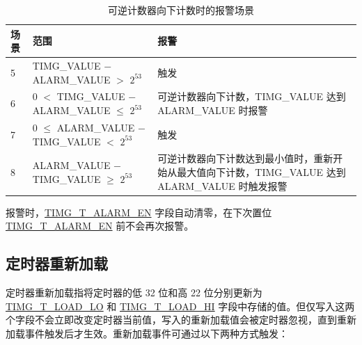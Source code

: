 \documentclass[main\_\_CN.tex]{subfiles}
\begin{document}
\begin{table}[H]
\centering
\caption{可逆计数器向下计数时的报警场景}
\label{tab:timg-alarm-generation-down}

\begin{tabular}{|l|l|m{7cm}|}
\hline
\rowcolor{lightgray}
    \textbf{场景} & \textbf{范围} & \textbf{报警} \\\hline
     5 & TIMG\_VALUE $-$ ALARM\_VALUE  $>$ $2^{53}$ & 触发 \\\hline
     6 &  0 $<$ TIMG\_VALUE $-$ ALARM\_VALUE $\leq$ $2^{53}$ & 可逆计数器向下计数，TIMG\_VALUE 达到 ALARM\_VALUE 时报警 \\\hline
     7 & 0 $\leq$ ALARM\_VALUE $-$ TIMG\_VALUE $<$ $2^{53}$ & 触发 \\\hline
     8 & ALARM\_VALUE $-$ TIMG\_VALUE $\geq$ $2^{53}$ & 可逆计数器向下计数达到最小值时，重新开始从最大值向下计数，TIMG\_VALUE 达到 ALARM\_VALUE 时触发报警 \\\hline
\end{tabular}
\end{table}

报警时，\hyperref[fielddesc:TIMGTXALARMEN]{TIMG\_T\_ALARM\_EN} 字段自动清零，在下次置位 \hyperref[fielddesc:TIMGTXALARMEN]{TIMG\_T\_ALARM\_EN} 前不会再次报警。

\subsection{定时器重新加载}
\label{sec:timg-func-descr-reload}

定时器重新加载指将定时器的低 32 位和高 22 位分别更新为 \hyperref[fielddesc:TIMGTXLOADLO]{TIMG\_T\_LOAD\_LO} 和 \hyperref[fielddesc:TIMGTXLOADHI]{TIMG\_T\_LOAD\_HI} 字段中存储的值。但仅写入这两个字段不会立即改变定时器当前值，写入的重新加载值会被定时器忽视，直到重新加载事件触发后才生效。重新加载事件可通过以下两种方式触发：
\end{document}
